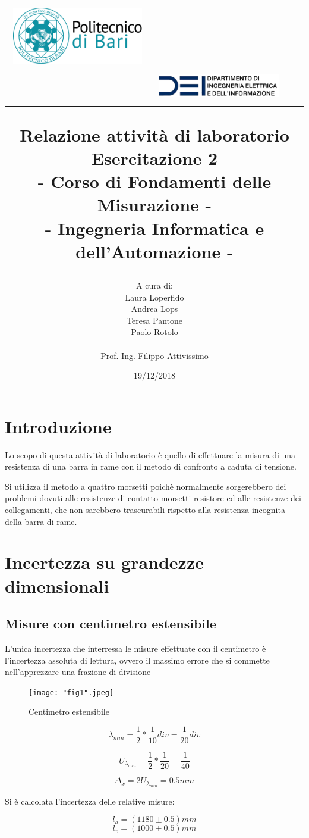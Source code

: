 \documentclass[a4paper]{article}
\title{\begin{center}
		\setlength{\tabcolsep}{0pt}
		\begin{tabular}{>{\raggedleft}m{3cm}>{\centering}m{\textwidth - 5cm\relax}>{\raggedright}m{3cm}}
			\includegraphics[width=\linewidth]{poliba.png}%
			&%
			\textbf{ } \\[5pt]%
			\textbf{\ }%
			&%
			\includegraphics[width=\linewidth]{dei.png} %
		\end{tabular}
	\end{center}
	\textbf{Relazione attività di laboratorio\\}
	\textbf{\large Esercitazione 2\\- Corso di Fondamenti delle Misurazione -\\ }
	{\normalsize 
		- Ingegneria Informatica e dell'Automazione -
}}
\author{A cura di:\\
	Laura Loperfido\\
	Andrea Lops \\
	Teresa Pantone\\
	Paolo Rotolo\\
	\\
	Prof. Ing. Filippo Attivissimo
}
\date{19/12/2018}
\begin{document}
\maketitle

\lstset{language=Matlab}

\section {Introduzione}
Lo scopo di questa attività di laboratorio è quello di effettuare la misura di una resistenza di una barra in rame con il metodo di confronto a caduta di tensione.

Si utilizza il metodo a quattro morsetti poichè normalmente sorgerebbero dei problemi dovuti alle resistenze di contatto
morsetti-resistore ed alle resistenze dei collegamenti, che non sarebbero trascurabili rispetto alla resistenza incognita della barra di rame.

\section {Incertezza su grandezze dimensionali}
\subsection{Misure con centimetro estensibile}
L'unica incertezza che interressa le misure effettuate con il centimetro è l'incertezza assoluta di lettura, ovvero il massimo errore che si commette nell'apprezzare una frazione di divisione

\begin{figure}[htp]
	\centering
	\texttt{[image: "fig1".jpeg]}
	\caption{Centimetro estensibile}
	\label{}
\end{figure}
\begin{Large} 
	\begin{equation}
	\lambda_{min}=\frac{1}{2}*\frac{1}{10} div= \frac{1}{20}div 
	\end{equation}
\end{Large}
\begin{Large} 
	\begin{equation}
	U_{\lambda_{min}}=\frac{1}{2}*\frac{1}{20} = \frac{1}{40} 
	\end{equation}
\end{Large}
\begin{Large} 
	\begin{equation}
	\Delta_x=2U_{\lambda_{min}} = 0.5 mm 
	\end{equation}
\end{Large}
Si è calcolata l'incertezza delle relative misure: 
\begin{Large} 
	\begin{equation}
		l_a = (1180\pm0.5)mm
	 \end{equation}
	 \begin{equation}
		l_v = (1000\pm0.5)mm
	 \end{equation}
\end{Large}
\end{document}
